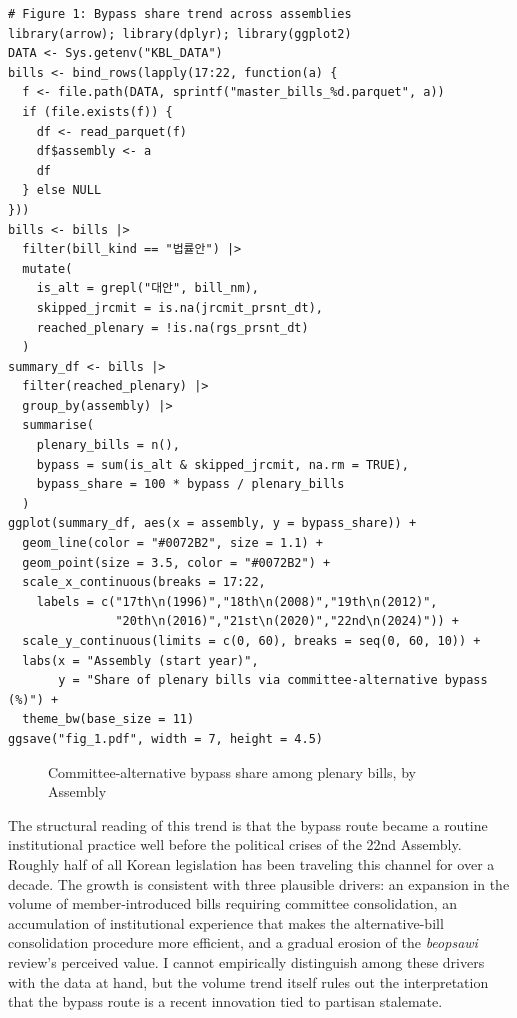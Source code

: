 \documentclass[11pt]{article}
\begin{document}
\begin{verbatim}
# Figure 1: Bypass share trend across assemblies
library(arrow); library(dplyr); library(ggplot2)
DATA <- Sys.getenv("KBL_DATA")
bills <- bind_rows(lapply(17:22, function(a) {
  f <- file.path(DATA, sprintf("master_bills_%d.parquet", a))
  if (file.exists(f)) {
    df <- read_parquet(f)
    df$assembly <- a
    df
  } else NULL
}))
bills <- bills |>
  filter(bill_kind == "법률안") |>
  mutate(
    is_alt = grepl("대안", bill_nm),
    skipped_jrcmit = is.na(jrcmit_prsnt_dt),
    reached_plenary = !is.na(rgs_prsnt_dt)
  )
summary_df <- bills |>
  filter(reached_plenary) |>
  group_by(assembly) |>
  summarise(
    plenary_bills = n(),
    bypass = sum(is_alt & skipped_jrcmit, na.rm = TRUE),
    bypass_share = 100 * bypass / plenary_bills
  )
ggplot(summary_df, aes(x = assembly, y = bypass_share)) +
  geom_line(color = "#0072B2", size = 1.1) +
  geom_point(size = 3.5, color = "#0072B2") +
  scale_x_continuous(breaks = 17:22,
    labels = c("17th\n(1996)","18th\n(2008)","19th\n(2012)",
               "20th\n(2016)","21st\n(2020)","22nd\n(2024)")) +
  scale_y_continuous(limits = c(0, 60), breaks = seq(0, 60, 10)) +
  labs(x = "Assembly (start year)",
       y = "Share of plenary bills via committee-alternative bypass (%)") +
  theme_bw(base_size = 11)
ggsave("fig_1.pdf", width = 7, height = 4.5)
\end{verbatim}

\begin{figure}[H]
\centering
{}
\caption{Committee-alternative bypass share among plenary bills, by Assembly}
\label{fig:bypass_trend}
\end{figure}

The structural reading of this trend is that the bypass route became a routine institutional practice well before the political crises of the 22nd Assembly. Roughly half of all Korean legislation has been traveling this channel for over a decade. The growth is consistent with three plausible drivers: an expansion in the volume of member-introduced bills requiring committee consolidation, an accumulation of institutional experience that makes the alternative-bill consolidation procedure more efficient, and a gradual erosion of the \textit{beopsawi} review's perceived value. I cannot empirically distinguish among these drivers with the data at hand, but the volume trend itself rules out the interpretation that the bypass route is a recent innovation tied to partisan stalemate.
\end{document}
